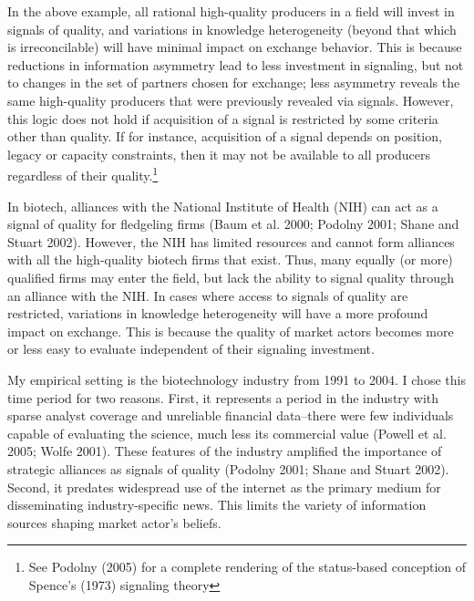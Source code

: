 In the above example, all rational high-quality producers in a field will invest in signals of quality, and variations in knowledge heterogeneity (beyond that which is irreconcilable) will have minimal impact on exchange behavior. This is because reductions in information asymmetry lead to less investment in signaling, but not to changes in the set of partners chosen for exchange; less asymmetry reveals the same high-quality producers that were previously revealed via signals. However, this logic does not hold if acquisition of a signal is restricted by some criteria other than quality. If for instance, acquisition of a signal depends on position, legacy or capacity constraints, then it may not be available to all producers regardless of their quality.\footnote{See Podolny (2005) for a complete rendering of the status-based conception of Spence's (1973) signaling theory} 

In biotech, alliances with the National Institute of Health (NIH) can act as a signal of quality for fledgeling firms (Baum et al. 2000; Podolny 2001; Shane and Stuart 2002). However, the NIH has limited resources and cannot form alliances with all the high-quality biotech firms that exist. Thus, many equally (or more) qualified firms may enter the field, but lack the ability to signal quality through an alliance with the NIH. In cases where access to signals of quality are restricted, variations in knowledge heterogeneity will have a more profound impact on exchange. This is because the quality of market actors becomes more or less easy to evaluate independent of their signaling investment. 

My empirical setting is the biotechnology industry from 1991 to 2004. I chose this time period for two reasons. First, it represents a period in the industry with sparse analyst coverage and unreliable financial data--there were few individuals capable of evaluating the science, much less its commercial value (Powell et al. 2005; Wolfe 2001). These features of the industry amplified the importance of strategic alliances as signals of quality (Podolny 2001; Shane and Stuart 2002). Second, it predates widespread use of the internet as the primary medium for disseminating industry-specific news. This limits the variety of information sources shaping market actor's beliefs.

